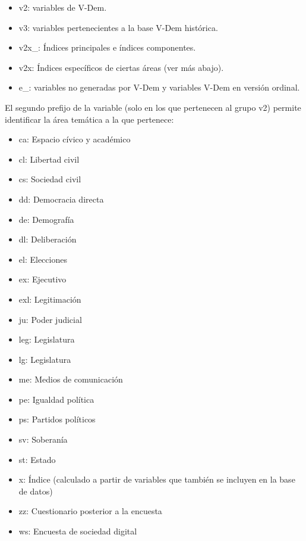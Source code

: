\documentclass{article}
\begin{document}
\begin{itemize}
  \item v2: variables de V-Dem.
  \item v3: variables pertenecientes a la base V-Dem histórica.
  \item v2x\_: Índices principales e índices componentes.
  \item v2x: Índices específicos de ciertas 
  áreas (ver más abajo).
  \item e\_: variables no generadas por V-Dem y variables V-Dem en versión ordinal.
\end{itemize}

El segundo prefijo de la variable (solo en los que pertenecen al grupo v2) permite 
identificar la área temática a la que pertenece:

\begin{itemize}
  \item ca: Espacio cívico y académico
  \item cl: Libertad civil
  \item cs: Sociedad civil
  \item dd: Democracia directa
  \item de: Demografía
  \item dl: Deliberación
  \item el: Elecciones
  \item ex: Ejecutivo
  \item exl: Legitimación
  \item ju: Poder judicial
  \item leg: Legislatura
  \item lg: Legislatura
  \item me: Medios de comunicación
  \item pe: Igualdad política
  \item ps: Partidos políticos
  \item sv: Soberanía
  \item st: Estado
  \item x: Índice (calculado a partir de variables que también se 
  incluyen en la base de datos)
  \item zz: Cuestionario posterior a la encuesta
  \item ws: Encuesta de sociedad digital
\end{itemize}
\end{document}

